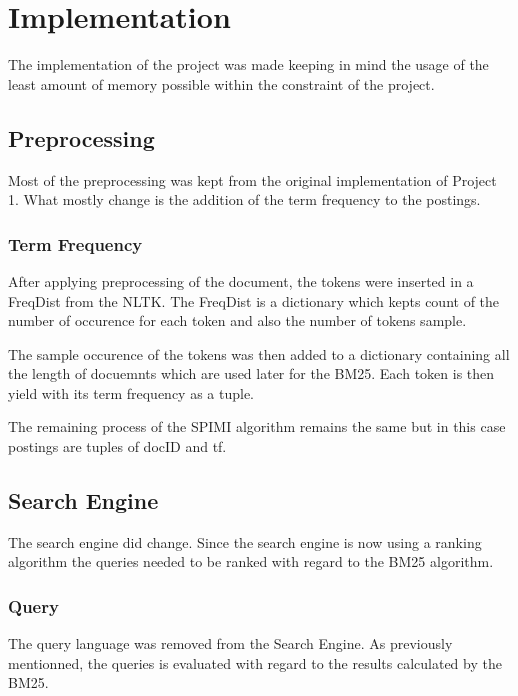 \chapter{Implementation}

The implementation of the project was made keeping in mind the usage of the least amount of memory possible within the constraint of the project.

\section{Preprocessing}

\par Most of the preprocessing was kept from the original implementation of Project 1. What mostly change is the addition of the term frequency to the postings.

\subsection{Term Frequency}

\par After applying preprocessing of the document, the tokens were inserted in a FreqDist from the NLTK. The FreqDist is a dictionary which kepts count of the number of occurence for each token and also the number of tokens sample.
\par The sample occurence of the tokens was then added to a dictionary containing all the length of docuemnts which are used later for the BM25. Each token is then yield with its term frequency as a tuple.
\par The remaining process of the SPIMI algorithm remains the same but in this case postings are tuples of docID and tf.

\section{Search Engine}

The search engine did change. Since the search engine is now using a ranking algorithm the queries needed to be ranked with regard to the BM25 algorithm.

\subsection{Query}

\par The query language was removed from the Search Engine. As previously mentionned, the queries is evaluated with regard to the results calculated by the BM25.

